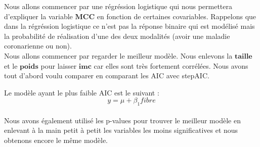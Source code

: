 \documentclass[
]{article}
\newenvironment{Shaded}{\begin{snugshade}}{\end{snugshade}}
\newcommand{\DataTypeTok}[1]{\textcolor[rgb]{0.13,0.29,0.53}{#1}}
\newcommand{\DecValTok}[1]{\textcolor[rgb]{0.00,0.00,0.81}{#1}}
\newcommand{\KeywordTok}[1]{\textcolor[rgb]{0.13,0.29,0.53}{\textbf{#1}}}
\newcommand{\NormalTok}[1]{#1}
\newcommand{\OperatorTok}[1]{\textcolor[rgb]{0.81,0.36,0.00}{\textbf{#1}}}
\begin{document}
Nous allons commencer par une régréssion logistique qui nous permettera
d'expliquer la variable \(\textbf{MCC}\) en fonction de certaines
covariables. Rappelons que dans la régréssion logistique ce n'est pas la
réponse binaire qui est modélisé mais la probabilité de réalisation
d'une des deux modalités (avoir une maladie coronarienne ou non).\\

Nous allons commencer par regarder le meilleur modèle. Nous enlevons la
\(\textbf{taille}\) et le \(\textbf{poids}\) pour laisser
\(\textbf{imc}\) car elles sont très fortement corrélées. Nous avons
tout d'abord voulu comparer en comparant les AIC avec stepAIC.

\begin{Shaded}
\end{Shaded}

Le modèle ayant le plus faible AIC est le suivant :
\[y=\mu +  \beta_1 fibre\]\\

Nous avons également utilisé les p-values pour trouver le meilleur
modèle en enlevant à la main petit à petit les variables les moins
significatives et nous obtenons encore le même modèle.

\begin{Shaded}
\end{Shaded}
\end{document}
